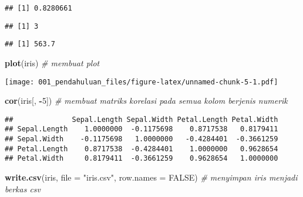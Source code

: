 \documentclass[]{article}
\newenvironment{Shaded}{\begin{snugshade}}{\end{snugshade}}
\newcommand{\KeywordTok}[1]{\textcolor[rgb]{0.13,0.29,0.53}{\textbf{#1}}}
\newcommand{\DataTypeTok}[1]{\textcolor[rgb]{0.13,0.29,0.53}{#1}}
\newcommand{\DecValTok}[1]{\textcolor[rgb]{0.00,0.00,0.81}{#1}}
\newcommand{\StringTok}[1]{\textcolor[rgb]{0.31,0.60,0.02}{#1}}
\newcommand{\CommentTok}[1]{\textcolor[rgb]{0.56,0.35,0.01}{\textit{#1}}}
\newcommand{\OtherTok}[1]{\textcolor[rgb]{0.56,0.35,0.01}{#1}}
\newcommand{\OperatorTok}[1]{\textcolor[rgb]{0.81,0.36,0.00}{\textbf{#1}}}
\newcommand{\NormalTok}[1]{#1}
\begin{document}
\begin{Shaded}
\end{Shaded}

\begin{verbatim}
## [1] 0.8280661
\end{verbatim}

\begin{Shaded}
\end{Shaded}

\begin{verbatim}
## [1] 3
\end{verbatim}

\begin{Shaded}
\end{Shaded}

\begin{verbatim}
## [1] 563.7
\end{verbatim}

\begin{Shaded}
\begin{Highlighting}[]
\KeywordTok{plot}\NormalTok{(iris) }\CommentTok{# membuat plot}
\end{Highlighting}
\end{Shaded}

\texttt{[image: 001\_pendahuluan\_files/figure-latex/unnamed-chunk-5-1.pdf]}

\begin{Shaded}
\begin{Highlighting}[]
\KeywordTok{cor}\NormalTok{(iris[, }\OperatorTok{-}\DecValTok{5}\NormalTok{]) }\CommentTok{# membuat matriks korelasi pada semua kolom berjenis numerik}
\end{Highlighting}
\end{Shaded}

\begin{verbatim}
##              Sepal.Length Sepal.Width Petal.Length Petal.Width
## Sepal.Length    1.0000000  -0.1175698    0.8717538   0.8179411
## Sepal.Width    -0.1175698   1.0000000   -0.4284401  -0.3661259
## Petal.Length    0.8717538  -0.4284401    1.0000000   0.9628654
## Petal.Width     0.8179411  -0.3661259    0.9628654   1.0000000
\end{verbatim}

\begin{Shaded}
\begin{Highlighting}[]
\KeywordTok{write.csv}\NormalTok{(iris, }\DataTypeTok{file =} \StringTok{"iris.csv"}\NormalTok{, }\DataTypeTok{row.names =} \OtherTok{FALSE}\NormalTok{) }\CommentTok{# menyimpan iris menjadi berkas csv }
\end{Highlighting}
\end{Shaded}
\end{document}
